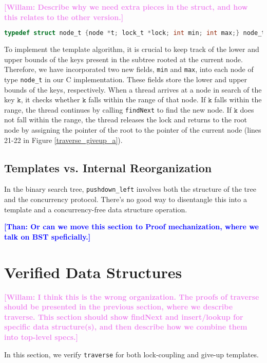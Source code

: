 \documentclass[a4paper,UKenglish,cleveref, autoref, thm-restate]{lipics-v2021}
\newcommand{\than}[1]{\textbf{\textcolor{blue}{[Than: #1]}}}
\newcommand{\wm}[1]{\textbf{\textcolor{violet}{[Willam: #1]}}}
\begin{document}
\wm{Describe why we need extra pieces in the struct, and how this relates to the other version.}
\begin{lstlisting}[language = C, backgroundcolor=\color{white}, basicstyle=\ttfamily\footnotesize]
	typedef struct node_t {node *t; lock_t *lock; int min; int max;} node_t;
\end{lstlisting}

To implement the template algorithm, it is crucial to keep track of the lower and upper bounds of the keys present in the subtree rooted at the current node. Therefore, we have incorporated two new fields, \lstinline{min} and \lstinline{max}, into each node of type \lstinline{node_t} in our C implementation. These fields store the lower and upper bounds of the keys, respectively. When a thread arrives at a node in search of the key $\texttt{k}$, it checks whether $\texttt{k}$ falls within the range of that node. If $\texttt{k}$ falls within the range, the thread continues by calling \lstinline{findNext} to find the new node. If $\texttt{k}$ does not fall within the range, the thread releases the lock and returns to the root node by assigning the pointer of the root to the pointer of the current node (lines 21-22 in Figure \ref{traverse_giveup_a}).


\subsection{Templates vs. Internal Reorganization} %
In the binary search tree, \texttt{pushdown\_left} involves both the structure of the tree and the concurrency protocol. There's no good way to disentangle this into a template and a concurrency-free data structure operation.

\than{Or can we move this section to Proof mechanization, where we talk on BST speficially.} 

\section{Verified Data Structures}

\wm{I think this is the wrong organization. The proofs of traverse should be presented in the previous section, where we describe traverse. This section should show findNext and insert/lookup for specific data structure(s), and then describe how we combine them into top-level specs.}

In this section, we verify \lstinline{traverse} for both lock-coupling and give-up templates.  
\end{document}
